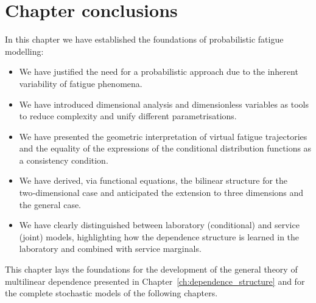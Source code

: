 \section*{Chapter conclusions}

In this chapter we have established the foundations of probabilistic fatigue modelling:

\begin{itemize}
    \item We have justified the need for a probabilistic approach due to the inherent variability of fatigue phenomena.
    \item We have introduced dimensional analysis and dimensionless variables as tools to reduce complexity and unify different parametrisations.
    \item We have presented the geometric interpretation of virtual fatigue trajectories and the equality of the expressions of the conditional distribution functions as a consistency condition.
    \item We have derived, via functional equations, the bilinear structure for the two‑dimensional case and anticipated the extension to three dimensions and the general case.
    \item We have clearly distinguished between laboratory (conditional) and service (joint) models, highlighting how the dependence structure is learned in the laboratory and combined with service marginals.
\end{itemize}

This chapter lays the foundations for the development of the general theory of multilinear dependence presented in Chapter~\ref{ch:dependence_structure} and for the complete stochastic models of the following chapters. 